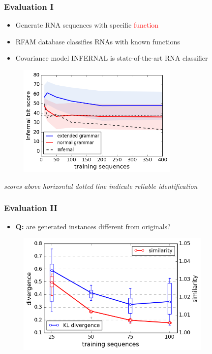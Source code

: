\documentclass{beamer}
\newcommand{\red}[1]{\textcolor{red}{#1}}
\begin{document}
\begin{frame}
    \frametitle{Evaluation I}
    \begin{itemize}
        \item Generate RNA sequences with specific \red{function}
        \item RFAM database classifies RNAs with known functions
        \item Covariance model INFERNAL is state-of-the-art RNA classifier 
    \end{itemize}

   \begin{figure}[ht]
        \centering
        \includegraphics[width=0.70\textwidth]{images/infernal_abstr.png}
    \end{figure}
   \small{\em scores above horizontal dotted line indicate reliable identification}
\end{frame}

\begin{frame}
    \frametitle{Evaluation II}
    
    \begin{itemize}
        \item {\bf Q:} are generated instances different from originals?
    \end{itemize}
   \begin{figure}[ht]
        \centering
        \includegraphics[width=0.85\textwidth]{images/learningcurve.png}
    \end{figure}
\end{frame}
\end{document}
